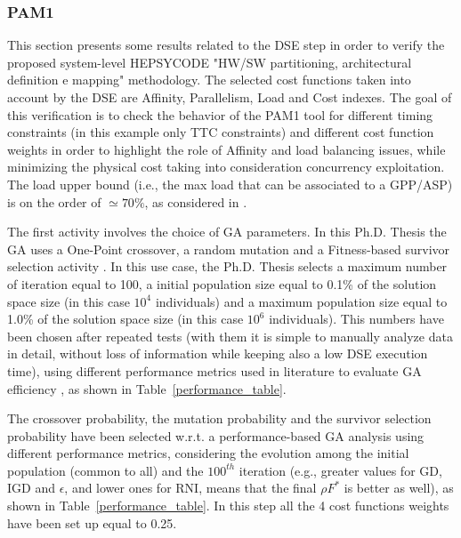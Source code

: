 \subsubsection{PAM1}
%
This section presents some results related to the DSE step in order to verify the proposed system-level HEPSYCODE "HW/SW partitioning, architectural definition e mapping" methodology. The selected cost functions taken into account by the DSE are Affinity, Parallelism, Load and Cost indexes. The goal of this verification is to check the behavior of the PAM1 tool for different timing constraints (in this example only TTC constraints) and different cost function weights in order to highlight the role of Affinity and load balancing issues, while minimizing the physical cost taking into consideration concurrency exploitation. The load upper bound (i.e., the max load that can be associated to a GPP/ASP) is on the order of $\simeq 70\%$, as considered in \cite{sched_load_UB}.\par
%
The first activity involves the choice of GA parameters. In this Ph.D. Thesis the GA uses a One-Point crossover, a random mutation and a Fitness-based survivor selection activity \cite{bibGATutorial}. In this use case, the Ph.D. Thesis selects a maximum number of iteration equal to 100, a initial population size equal to 0.1\% of the solution space size (in this case $10^4$ individuals) and a maximum population size equal to 1.0\% of the solution space size (in this case $10^6$ individuals). This numbers have been chosen after repeated tests (with them it is simple to manually analyze data in detail, without loss of information while keeping also a low DSE execution time), using different performance metrics used in literature to evaluate GA efficiency \cite{metriche1,metriche2,metriche3,metriche8}, as shown in Table~\ref{performance_table}. \par
The crossover probability, the mutation probability and the survivor selection probability have been selected w.r.t. a performance-based GA analysis using different performance metrics, considering the evolution among the initial population (common to all) and the $100^{th}$ iteration (e.g., greater values for GD, IGD and $\epsilon$, and lower ones for RNI, means that the final $\rho F^\ast$ is better as well), as shown in Table~\ref{performance_table}. In this step all the 4 cost functions weights have been set up equal to 0.25. \par
